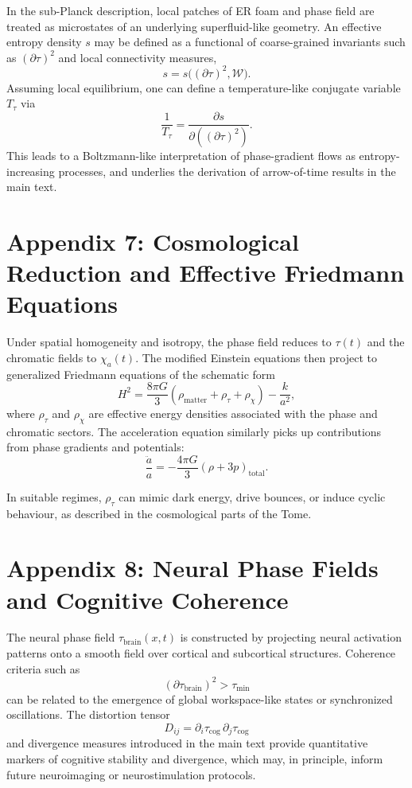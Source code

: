 In the sub-Planck description, local patches of ER foam and phase field are treated as microstates of an underlying superfluid-like geometry.
An effective entropy density \(s\) may be defined as a functional of coarse-grained invariants such as \((\partial\tau)^2\) and local connectivity measures,
\[
s = s\big((\partial\tau)^2, \mathcal{W}\big).
\]
Assuming local equilibrium, one can define a temperature-like conjugate variable \(T_\tau\) via
\[
\frac{1}{T_\tau} = \frac{\partial s}{\partial ((\partial\tau)^2)}.
\]
This leads to a Boltzmann-like interpretation of phase-gradient flows as entropy-increasing processes, and underlies the derivation of arrow-of-time results in the main text.

\chapter{Appendix 7: Cosmological Reduction and Effective Friedmann Equations}

Under spatial homogeneity and isotropy, the phase field reduces to \(\tau(t)\) and the chromatic fields to \(\chi_a(t)\).
The modified Einstein equations then project to generalized Friedmann equations of the schematic form
\[
H^2 = \frac{8\pi G}{3}\left(\rho_{\mathrm{matter}} + \rho_\tau + \rho_\chi\right) - \frac{k}{a^2},
\]
where \(\rho_\tau\) and \(\rho_\chi\) are effective energy densities associated with the phase and chromatic sectors.
The acceleration equation similarly picks up contributions from phase gradients and potentials:
\[
\frac{\ddot a}{a} = -\frac{4\pi G}{3}\left(\rho + 3p\right)_{\mathrm{total}}.
\]

In suitable regimes, \(\rho_\tau\) can mimic dark energy, drive bounces, or induce cyclic behaviour, as described in the cosmological parts of the Tome.

\chapter{Appendix 8: Neural Phase Fields and Cognitive Coherence}

The neural phase field \(\tau_{\mathrm{brain}}(x,t)\) is constructed by projecting neural activation patterns onto a smooth field over cortical and subcortical structures.
Coherence criteria such as
\[
(\partial\tau_{\mathrm{brain}})^2 > \tau_{\min}
\]
can be related to the emergence of global workspace-like states or synchronized oscillations.
The distortion tensor
\[
D_{ij} = \partial_i \tau_{\mathrm{cog}}\,\partial_j \tau_{\mathrm{cog}}
\]
and divergence measures introduced in the main text provide quantitative markers of cognitive stability and divergence, which may, in principle, inform future neuroimaging or neurostimulation protocols.

